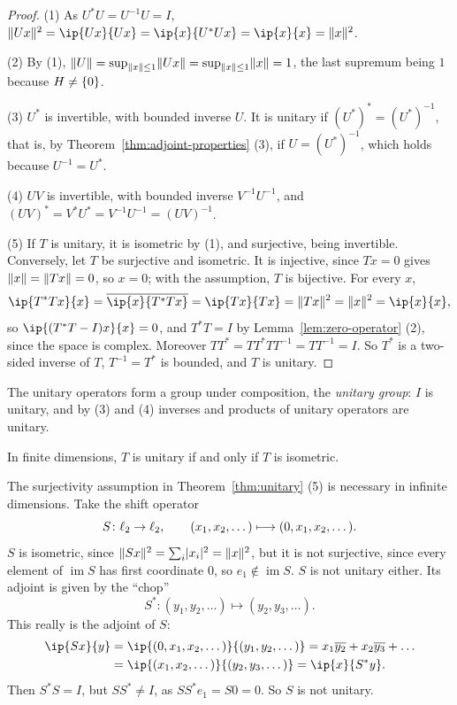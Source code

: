 \begin{proof}
(1) As $U^* U = U^{-1} U = I$,
$\norm{Ux}^2 = \ip{Ux}{Ux} = \ip{x}{U^* U x} = \ip{x}{x} = \norm{x}^2$.

(2) By (1), $\lVert U\rVert = \sup_{\lVert x\rVert \le 1} \lVert Ux\rVert
= \sup_{\lVert x\rVert \le 1} \lVert x\rVert = 1$, the last supremum being $1$ because
$H \ne \{0\}$.

(3) $U^*$ is invertible, with bounded inverse $U$. It is unitary if
$(U^*)^* = (U^*)^{-1}$, that is, by
Theorem~\ref{thm:adjoint-properties} (3), if $U = (U^*)^{-1}$, which holds
because $U^{-1} = U^*$.

(4) $UV$ is invertible, with bounded inverse $V^{-1} U^{-1}$, and
$(UV)^* = V^* U^* = V^{-1} U^{-1} = (UV)^{-1}$.

(5) If $T$ is unitary, it is isometric by (1), and surjective, being
invertible. Conversely, let $T$ be surjective and isometric. It is injective,
since $Tx = 0$ gives $\lVert x\rVert = \lVert Tx\rVert = 0$, so $x = 0$; with the
assumption, $T$ is bijective. For every $x$,
\[
  \ip{T^* T x}{x} = \overline{\ip{x}{T^* T x}} = \ip{Tx}{Tx}
  = \norm{Tx}^2 = \norm{x}^2 = \ip{x}{x} ,
\]
so $\ip{(T^* T - I)x}{x} = 0$, and $T^* T = I$ by
Lemma~\ref{lem:zero-operator} (2), since the space is complex. Moreover
$T T^* = T T^* T T^{-1} = T T^{-1} = I$. So $T^*$ is a two-sided inverse of
$T$, $T^{-1} = T^*$ is bounded, and $T$ is unitary.
\end{proof}

\begin{remark}
The unitary operators form a group under composition, the \emph{unitary
group}: $I$ is unitary, and by (3) and (4) inverses and products of unitary
operators are unitary.
\end{remark}

\begin{remark}
In finite dimensions, $T$ is unitary if and only if $T$ is isometric.
\end{remark}

\begin{example}\label{ex:shift}
The surjectivity assumption in Theorem~\ref{thm:unitary} (5) is necessary
in infinite dimensions. Take the shift operator
\[
  S \colon \ell_{2} \to \ell_{2}, \qquad
  (x_1, x_2, \dots) \longmapsto (0, x_1, x_2, \dots) .
\]
$S$ is isometric, since $\lVert Sx\rVert^2 = \sum_{i} \lvert x_i\rvert^2 = \lVert x\rVert^2$,
but it is not surjective, since every element of $\operatorname{im} S$ has
first coordinate $0$, so $e_1 \notin \operatorname{im} S$. $S$ is not
unitary either. Its adjoint is given by the “chop”
\[
  S^* \colon (y_1, y_2, \dots) \longmapsto (y_2, y_3, \dots) .
\]
This really is the adjoint of $S$:
\[
  \begin{aligned}
    \ip{Sx}{y} &= \ip{(0, x_1, x_2, \dots)}{(y_1, y_2, \dots)}
    = x_1 \overline{y_2} + x_2 \overline{y_3} + \dots \\
    &= \ip{(x_1, x_2, \dots)}{(y_2, y_3, \dots)} = \ip{x}{S^* y} .
  \end{aligned}
\]
Then $S^* S = I$, but $S S^* \ne I$, as $S S^* e_1 = S 0 = 0$. So $S$ is not
unitary.
\end{example}

